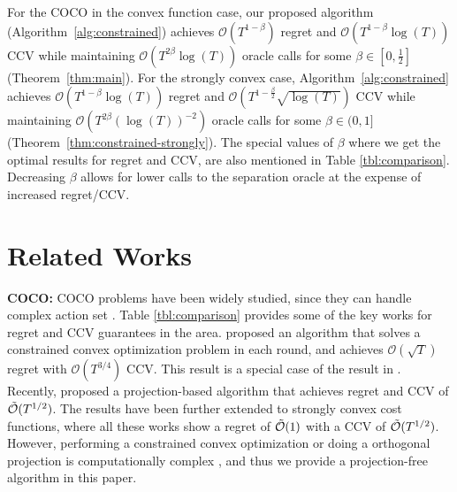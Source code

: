 \documentclass[twoside,11pt,]{article}
\newcommand{\op}[1]{\operatorname{#1}}
\newcommand{\C}[1]{\mathcal{#1}}
\renewcommand{\cite}[1]{\citep{#1}}
\begin{document}
\begin{enumerate}[leftmargin=*,itemsep=2pt, parsep=0pt]
For the COCO in the convex function case, our proposed algorithm  (Algorithm~\ref{alg:constrained}) achieves $\C{O}(T^{1-\beta})$ regret and $\C{O}(T^{1-\beta}\op{log}(T))$ CCV while maintaining $\C{O}(T^{2\beta}\op{log}(T))$ oracle calls for some $\beta\in[0,\frac{1}{2}]$ (Theorem~\ref{thm:main}). For the strongly convex case, Algorithm~\ref{alg:constrained} achieves $\C{O}(T^{1-\beta}\op{log}(T))$ regret and $\C{O}(T^{1-\frac{\beta}{2}}\sqrt{\op{log}(T)})$ CCV while maintaining $\C{O}(T^{2\beta}(\log(T))^{-2})$ oracle calls for some $\beta\in(0,1]$ (Theorem~\ref{thm:constrained-strongly}). The special values of $\beta$ where we get the optimal results for regret and CCV, are also mentioned in Table \ref{tbl:comparison}. Decreasing $\beta$ allows for lower calls to the separation oracle at the expense of increased regret/CCV. 

\end{enumerate}

\vspace{-.2in}

\section{Related Works}



\noindent \textbf{COCO:} COCO problems have been widely studied, since they can handle complex action set \cite{mahdavi2012trading}. Table \ref{tbl:comparison} provides some of the key works for regret and CCV guarantees in the area. \cite{guo2022online} proposed an algorithm that solves a constrained convex optimization problem in each round, and achieves $\C{O}(\sqrt{T})$ regret with $\C{O}({T}^{3/4})$ CCV. This result is a special case of the result in \cite{yi2023distributed}. Recently, \citet{sinha2024optimal} proposed a projection-based algorithm that achieves regret and CCV of $\Tilde{\C{O}}(T^{1/2})$. The results have been further extended to strongly convex cost functions, where all these works show a regret of $\Tilde{\C{O}}(1)$ with a CCV of $\Tilde{\C{O}}(T^{1/2})$. However, performing a constrained convex optimization or doing a orthogonal projection is computationally complex \cite{garber2022new}, and thus we provide a projection-free algorithm in this paper. 
\end{document}
